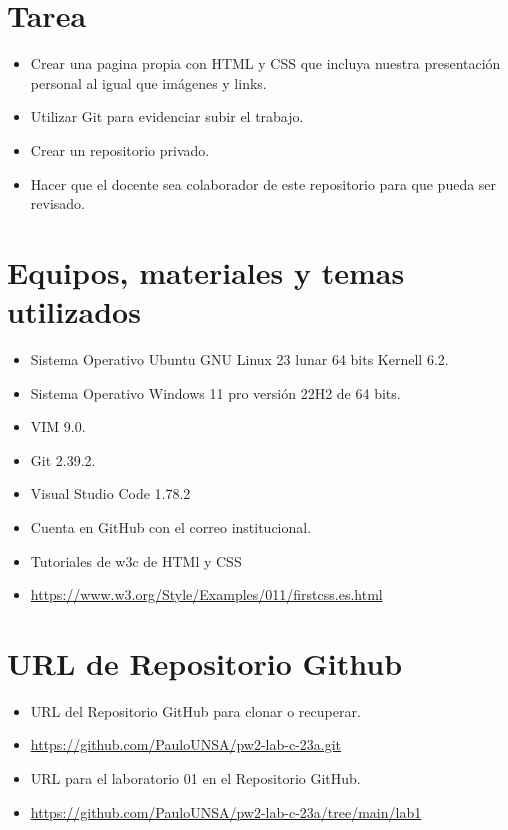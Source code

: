 \documentclass{article}
\begin{document}
	\section{Tarea}
	\begin{itemize}		
		\item Crear una pagina propia con HTML y CSS que incluya nuestra presentación 
		personal al igual que imágenes y links.
		\item Utilizar Git para evidenciar subir el trabajo.
		\item Crear un repositorio privado.
		\item Hacer que el docente sea colaborador de este repositorio para que pueda ser revisado.
	\end{itemize}
		
	\section{Equipos, materiales y temas utilizados}
	\begin{itemize}
		\item Sistema Operativo Ubuntu GNU Linux 23 lunar 64 bits Kernell 6.2.
		\item Sistema Operativo Windows 11 pro versión 22H2 de 64 bits.
		\item VIM 9.0.
		\item Git 2.39.2.
		\item Visual Studio Code 1.78.2
		\item Cuenta en GitHub con el correo institucional.
		\item Tutoriales de w3c de HTMl y CSS
		\item \url{https://www.w3.org/Style/Examples/011/firstcss.es.html}
	\end{itemize}
	
	\section{URL de Repositorio Github}
	\begin{itemize}
		\item URL del Repositorio GitHub para clonar o recuperar.
		\item \url{https://github.com/PauloUNSA/pw2-lab-c-23a.git}
		\item URL para el laboratorio 01 en el Repositorio GitHub.
		\item \url{https://github.com/PauloUNSA/pw2-lab-c-23a/tree/main/lab1}
	\end{itemize}
	
\end{document}
